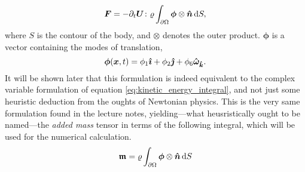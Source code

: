 \[
\bm{F} = -\partial_t\bm{U}\colon\varrho\int_{\partial\Omega} \bm{\phi}\otimes\bm{\hat{n}} \,\mathrm{d} S,
\]
where $S$ is the contour of the body, and $\otimes$ denotes the outer product.
$\bm{\phi}$ is a vector containing the modes of translation,
\[
    \bm{\phi}(\bm{x}, t) = \phi_1 \bm{\hat{\imath}} + \phi_2 \bm{\hat{\jmath}} + \phi_6 \bm{\hat{\omega}}_{\bm{\hat{k}}}.
\]
It will be shown later that this formulation is indeed equivalent to the complex variable formulation of equation \eqref{eq:kinetic_energy_integral}, and not just some heuristic deduction from the oughts of Newtonian physics.
This is the very same formulation found in the lecture notes, yielding---what heusristically ought to be named---the \emph{added mass} tensor in terms of the following integral, which will be used for the numerical calculation.
\begin{equation}\label{eq:added_mass}
    \bm{\mathfrak{m}} = \varrho \int_{\partial\Omega} \bm{\phi} \otimes \bm{\hat{n}} \,\mathrm{d} S
\end{equation}
